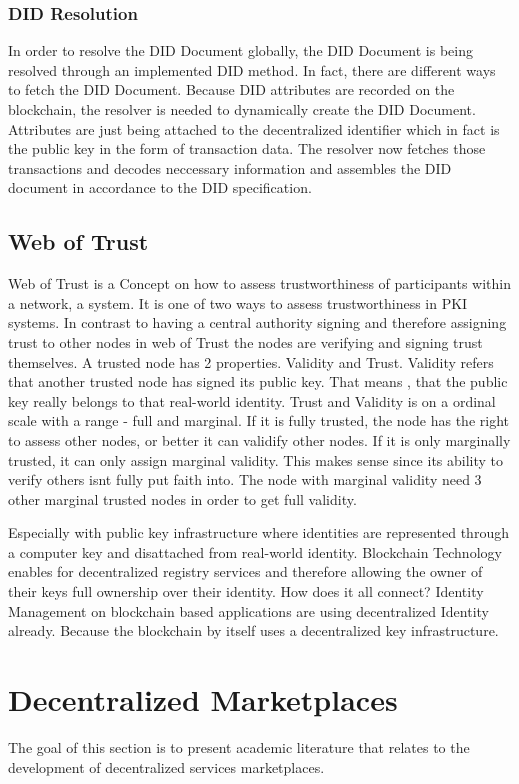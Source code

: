 \subsubsection{DID Resolution}
In order to resolve the DID Document globally, the DID Document is being resolved through an implemented DID method. In fact, there are different ways to fetch the DID Document. Because DID attributes are recorded on the blockchain, the resolver is needed to dynamically create the DID Document. Attributes are just being attached to the decentralized identifier which in fact is the public key in the form of transaction data. The resolver now fetches those transactions and decodes neccessary information and assembles the DID document in accordance to the DID specification. 

\subsection{Web of Trust}

Web of Trust is a Concept on how to assess trustworthiness of participants within a network, a system. It is one of two ways to assess trustworthiness in PKI systems. In contrast to having a central authority signing and therefore assigning trust to other nodes in web of Trust the nodes are verifying and signing trust themselves. 
A trusted node has 2 properties. Validity and Trust. Validity refers that another trusted node has signed its public key. That means , that the public key really belongs to that real-world identity. Trust and Validity is on a ordinal scale with a range - full and marginal. If it is fully trusted, the node has the right to assess other nodes, or better it can validify other nodes. If it is only marginally trusted, it can only assign marginal validity. This makes sense since its ability to verify others isnt fully put faith into. The node with marginal validity need 3 other marginal trusted nodes in order to get full validity. 


Especially with public key infrastructure where identities are represented through a computer key and disattached from real-world identity. Blockchain Technology enables for decentralized registry services and therefore allowing the owner of their keys full ownership over their identity. 
How does it all connect? 
Identity Management on blockchain based applications are using decentralized Identity already. 
Because the blockchain by itself uses a decentralized key infrastructure. 

\section{Decentralized Marketplaces}
The goal of this section is to present academic literature that relates to the development of decentralized services marketplaces. 

